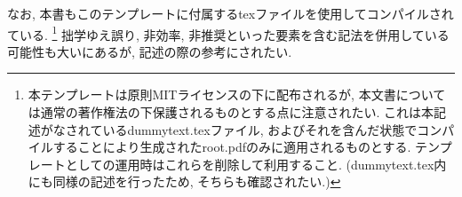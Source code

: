 なお, 本書もこのテンプレートに付属するtexファイルを使用してコンパイルされている.
\footnote{
    本テンプレートは原則MITライセンスの下に配布されるが, 本文書については通常の著作権法の下保護されるものとする点に注意されたい.
    これは本記述がなされているdummytext.texファイル, およびそれを含んだ状態でコンパイルすることにより生成されたroot.pdfのみに適用されるものとする.
    テンプレートとしての運用時はこれらを削除して利用すること. (dummytext.tex内にも同様の記述を行ったため, そちらも確認されたい.)
}
拙学ゆえ誤り, 非効率, 非推奨といった要素を含む記法を併用している可能性も大いにあるが, 記述の際の参考にされたい.
